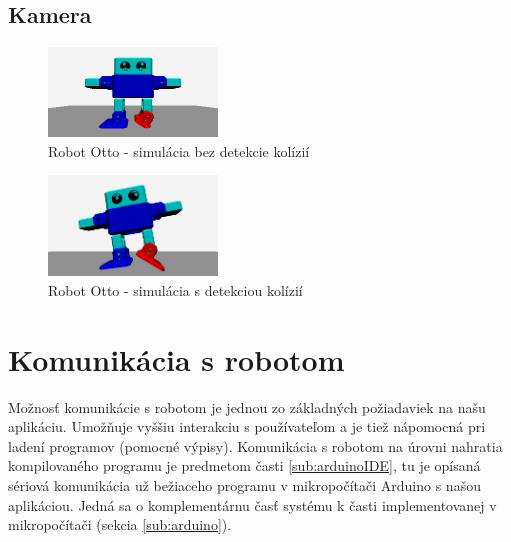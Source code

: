 \subsection{Kamera}








\begin{figure}
\centerline{\includegraphics[width=0.4\textwidth]{images/otto-without-collision}}
\caption[Robot Otto - simulácia bez detekcie kolízií]{Robot Otto - simulácia bez detekcie kolízií}
\label{obr:otto-without-collision}
\end{figure}

\begin{figure}
\centerline{\includegraphics[width=0.4\textwidth]{images/otto-with-collision}}
\caption[Robot Otto - simulácia s detekciou kolízií]{Robot Otto - simulácia s detekciou kolízií}
\label{obr:otto-with-collision}
\end{figure}


\section{Komunikácia s robotom}
Možnosť komunikácie s robotom je jednou zo základných požiadaviek na našu aplikáciu. Umožňuje vyššiu interakciu s používateľom a je tiež nápomocná pri ladení programov (pomocné výpisy). Komunikácia s robotom na úrovni nahratia kompilovaného programu je predmetom časti \ref{sub:arduinoIDE}, tu je opísaná sériová komunikácia už bežiaceho programu v mikropočítači Arduino s našou aplikáciou. Jedná sa o komplementárnu časť systému k časti implementovanej v mikropočítači (sekcia \ref{sub:arduino}).

